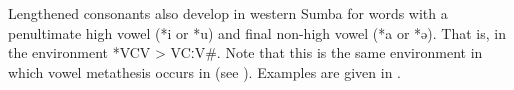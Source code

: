 Lengthened consonants also develop in western Sumba
for words with a penultimate high vowel
(*i or *u) and final non-high vowel (*a or *ə).
That is, in the environment *V\tsc{[+high]}CV\tsc{[-low]}{\#} > VCːV{\#}.
Note that this is the same environment in which vowel metathesis
occurs in  (see  ).
Examples are given in .

